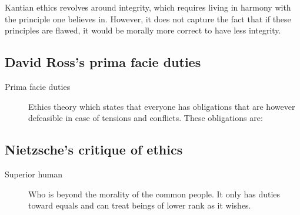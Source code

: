 \begin{remark}
    Kantian ethics revolves around integrity, which requires living in harmony with the principle one believes in. However, it does not capture the fact that if these principles are flawed, it would be morally more correct to have less integrity.
\end{remark}


\subsection{David Ross's prima facie duties}

\begin{description}
    \item[Prima facie duties] 
        Ethics theory which states that everyone has obligations that are however defeasible in case of tensions and conflicts. These obligations are:
\end{description}


\subsection{Nietzsche's critique of ethics}

\begin{description}
    \item[Superior human] 
        Who is beyond the morality of the common people. It only has duties toward equals and can treat beings of lower rank as it wishes.
\end{description}



